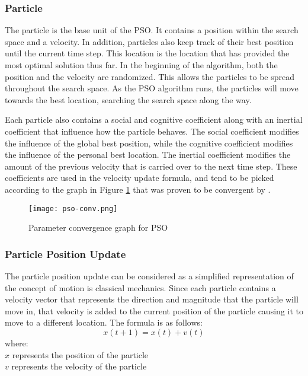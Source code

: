 \subsubsection{Particle}
The particle is the base unit of the PSO. It contains a position within the search space and a velocity. In addition, particles also keep track of their best position until the current time step. This location is the location that has provided the most optimal solution thus far. In the beginning of the algorithm, both the position and the velocity are randomized. This allows the particles to be spread throughout the search space. As the PSO algorithm runs, the particles will move towards the best location, searching the search space along the way.

Each particle also contains a social and cognitive coefficient along with an inertial coefficient that influence how the particle behaves. The social coefficient modifies the influence of the global best position, while the cognitive coefficient modifies the influence of the personal best location. The inertial coefficient modifies the amount of the previous velocity that is carried over to the next time step. These coefficients are used in the velocity update formula, and tend to be picked according to the graph in Figure \ref{fig:pso-convergence} that was proven to be convergent by \cite{englebrecht-pso}.

\begin{figure}
  \centering
  \texttt{[image: pso-conv.png]}
  \caption{Parameter convergence graph for PSO}
  \label{fig:pso-convergence}
\end{figure}

\subsubsection{Particle Position Update}
The particle position update can be considered as a simplified representation of the concept of motion is classical mechanics. Since each particle contains a velocity vector that represents the direction and magnitude that the particle will move in, that velocity is added to the current position of the particle causing it to move to a different location. The formula is as follows:
\begin{equation} \label{eqn:loc-update}
 x(t+1) = x(t) + v(t)
\end{equation}
where:\\
\indent $x$ represents the position of the particle\\
\indent $v$ represents the velocity of the particle

